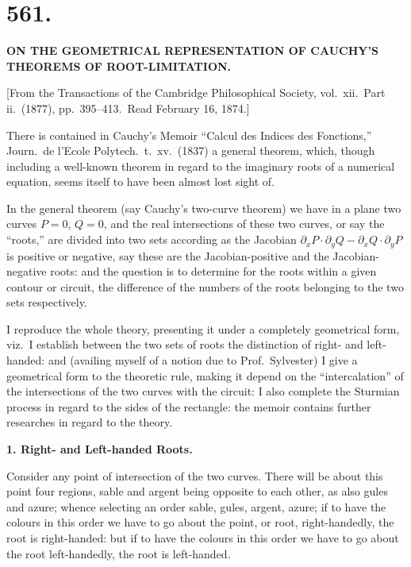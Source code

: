 \documentclass[11pt,a4paper]{book}
\begin{document}
\section*{\textbf{561.}}

\begin{center}
{\large \textbf{ON THE GEOMETRICAL REPRESENTATION OF CAUCHY'S}}\\[4pt]
{\large \textbf{THEOREMS OF ROOT-LIMITATION.}}
\end{center}

\begin{flushright}
{\small [From the Transactions of the Cambridge Philosophical Society, vol.\ xii.\ Part ii.\ (1877), pp.\ 395--413.\ Read February 16, 1874.]}
\end{flushright}

There is contained in Cauchy's Memoir ``Calcul des Indices des Fonctions,'' Journ.\ de l'Ecole Polytech.\ t.\ xv.\ (1837) a general theorem, which, though including a well-known theorem in regard to the imaginary roots of a numerical equation, seems itself to have been almost lost sight of.

In the general theorem (say Cauchy's two-curve theorem) we have in a plane two curves $P = 0$, $Q = 0$, and the real intersections of these two curves, or say the ``roots,'' are divided into two sets according as the Jacobian $\partial_x P \cdot \partial_y Q - \partial_x Q \cdot \partial_y P$ is positive or negative, say these are the Jacobian-positive and the Jacobian-negative roots: and the question is to determine for the roots within a given contour or circuit, the difference of the numbers of the roots belonging to the two sets respectively.

I reproduce the whole theory, presenting it under a completely geometrical form, viz.\ I establish between the two sets of roots the distinction of right- and left-handed: and (availing myself of a notion due to Prof.\ Sylvester) I give a geometrical form to the theoretic rule, making it depend on the ``intercalation'' of the intersections of the two curves with the circuit: I also complete the Sturmian process in regard to the sides of the rectangle: the memoir contains further researches in regard to the theory.

\textbf{1. Right- and Left-handed Roots.}

Consider any point of intersection of the two curves. There will be about this point four regions, sable and argent being opposite to each other, as also gules and azure; whence selecting an order sable, gules, argent, azure; if to have the colours in this order we have to go about the point, or root, right-handedly, the root is right-handed: but if to have the colours in this order we have to go about the root left-handedly, the root is left-handed.
\end{document}
